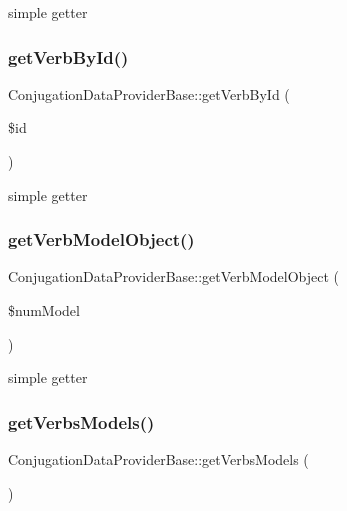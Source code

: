 simple getter \hypertarget{classConjugationDataProviderBase_a8269abd2a9be2679d2cd9f7f50ae9151}{}\label{classConjugationDataProviderBase_a8269abd2a9be2679d2cd9f7f50ae9151} 
\subsubsection{\texorpdfstring{get\+Verb\+By\+Id()}{getVerbById()}}
{\footnotesize\ttfamily Conjugation\+Data\+Provider\+Base\+::get\+Verb\+By\+Id (\begin{DoxyParamCaption}\item[{}]{\$id }\end{DoxyParamCaption})\hspace{0.3cm}{\ttfamily [abstract]}}

simple getter \hypertarget{classConjugationDataProviderBase_a4be78cfcdc11584d355bdfc8b988a3ca}{}\label{classConjugationDataProviderBase_a4be78cfcdc11584d355bdfc8b988a3ca} 
\subsubsection{\texorpdfstring{get\+Verb\+Model\+Object()}{getVerbModelObject()}}
{\footnotesize\ttfamily Conjugation\+Data\+Provider\+Base\+::get\+Verb\+Model\+Object (\begin{DoxyParamCaption}\item[{}]{\$num\+Model }\end{DoxyParamCaption})\hspace{0.3cm}{\ttfamily [abstract]}}

simple getter \hypertarget{classConjugationDataProviderBase_a12389ca76dbe2e31e08fee6b5333eed9}{}\label{classConjugationDataProviderBase_a12389ca76dbe2e31e08fee6b5333eed9} 
\subsubsection{\texorpdfstring{get\+Verbs\+Models()}{getVerbsModels()}}
{\footnotesize\ttfamily Conjugation\+Data\+Provider\+Base\+::get\+Verbs\+Models (\begin{DoxyParamCaption}{ }\end{DoxyParamCaption})\hspace{0.3cm}{\ttfamily [abstract]}}

